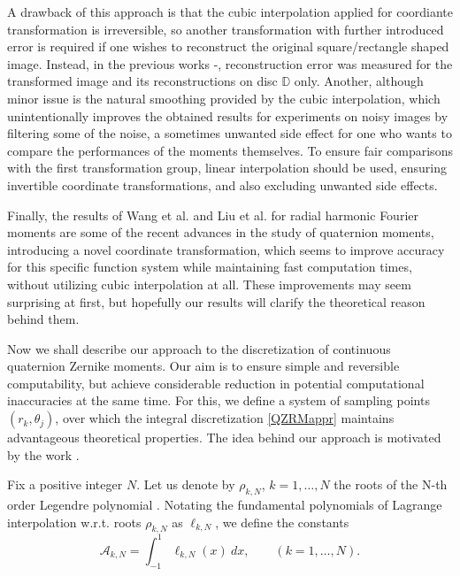 \documentclass[12pt]{article}
\newcommand{\D}{\mathbb{D}}
\begin{document}
A drawback of this approach is that the cubic interpolation applied for coordiante transformation is irreversible, so another transformation with further introduced error is required if one wishes to reconstruct the original square/rectangle shaped image. Instead, in the previous works \cite{LiaoPawlak}-\cite{HosnyChebyshev}, reconstruction error was measured for the transformed image and its reconstructions on disc $\D$ only. Another, although minor issue is the natural smoothing provided by the cubic interpolation, which unintentionally improves the obtained results for experiments on noisy images by filtering some of the noise, a sometimes unwanted side effect for one who wants to compare the performances of the moments themselves. To ensure fair comparisons with the first transformation group, linear interpolation should be used, ensuring invertible coordinate transformations, and also excluding unwanted side effects.

Finally, the results of Wang et al. \cite{WangAcc} and Liu et al. \cite{LiuAcc} for radial harmonic Fourier moments are some of the recent advances in the study of quaternion moments, introducing a novel coordinate transformation, which seems to improve accuracy for this specific function system while maintaining fast computation times, without utilizing cubic interpolation at all. These improvements may seem surprising at first, but hopefully our results will clarify the theoretical reason behind them.

Now we shall describe our approach to the discretization of continuous quaternion Zernike moments. Our aim is to ensure simple and reversible computability, but achieve considerable reduction in potential computational inaccuracies at the same time. For this, we define a system of sampling points $(r_k,\theta_j)$, over which the integral discretization \eqref{QZRMappr} maintains advantageous theoretical properties. The idea behind our approach is motivated by the work \cite{PapSchipp}.

Fix a positive integer $N$. Let us denote by $\rho_{k,N}$, $k=1,\ldots,N$ the roots of the N-th order Legendre polynomial \cite{Szego}. Notating the fundamental polynomials of Lagrange interpolation w.r.t. roots $\rho_{k,N}$ as $\ell_{k,N}$, we define the constants
\[
	\mathcal{A}_{k,N} = \int_{-1}^{1} \ell_{k,N}(x)\ dx, \qquad (k=1,\ldots,N).
\]
\end{document}
